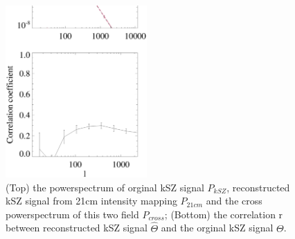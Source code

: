 \begin{figure}[tbp]
	\begin{center}
		\includegraphics[width=0.48\textwidth,height=0.52\textheight]{powermomen15.eps}
	\end{center}
	\vspace{-0.7cm}
	\caption{(Top) the powerspectrum of orginal kSZ signal $P_{kSZ}$, reconstructed kSZ signal from 21cm intensity mapping $P_{21cm}$ and the cross powerspectrum of this two field $P_{cross}$; 
(Bottom) the correlation r between reconstructed kSZ signal $\hat\Theta$ and the orginal kSZ signal $\Theta$.} 
\label{fig:powermomen15}
\end{figure}


